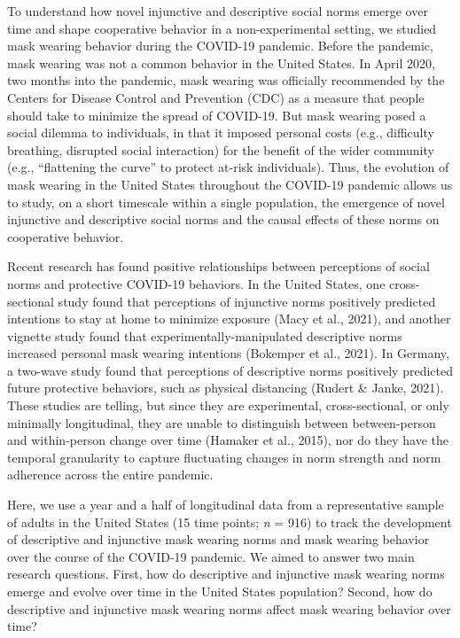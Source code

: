 \documentclass[
  english,
  man,floatsintext]{apa6}
\begin{document}
To understand how novel injunctive and descriptive social norms emerge over time and shape cooperative behavior in a non-experimental setting, we studied mask wearing behavior during the COVID-19 pandemic. Before the pandemic, mask wearing was not a common behavior in the United States. In April 2020, two months into the pandemic, mask wearing was officially recommended by the Centers for Disease Control and Prevention (CDC) as a measure that people should take to minimize the spread of COVID-19. But mask wearing posed a social dilemma to individuals, in that it imposed personal costs (e.g., difficulty breathing, disrupted social interaction) for the benefit of the wider community (e.g., ``flattening the curve'' to protect at-risk individuals). Thus, the evolution of mask wearing in the United States throughout the COVID-19 pandemic allows us to study, on a short timescale within a single population, the emergence of novel injunctive and descriptive social norms and the causal effects of these norms on cooperative behavior.

Recent research has found positive relationships between perceptions of social norms and protective COVID-19 behaviors. In the United States, one cross-sectional study found that perceptions of injunctive norms positively predicted intentions to stay at home to minimize exposure (Macy et al., 2021), and another vignette study found that experimentally-manipulated descriptive norms increased personal mask wearing intentions (Bokemper et al., 2021). In Germany, a two-wave study found that perceptions of descriptive norms positively predicted future protective behaviors, such as physical distancing (Rudert \& Janke, 2021). These studies are telling, but since they are experimental, cross-sectional, or only minimally longitudinal, they are unable to distinguish between between-person and within-person change over time (Hamaker et al., 2015), nor do they have the temporal granularity to capture fluctuating changes in norm strength and norm adherence across the entire pandemic.

Here, we use a year and a half of longitudinal data from a representative sample of adults in the United States (15 time points; \emph{n} = 916) to track the development of descriptive and injunctive mask wearing norms and mask wearing behavior over the course of the COVID-19 pandemic. We aimed to answer two main research questions. First, how do descriptive and injunctive mask wearing norms emerge and evolve over time in the United States population? Second, how do descriptive and injunctive mask wearing norms affect mask wearing behavior over time?
\end{document}
